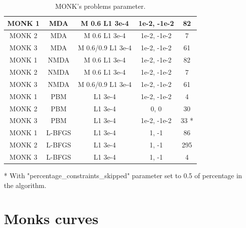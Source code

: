 \begin{table}[H]
\begin{tabular}{|c|c|c|c|c|}
		MONK 1        &    MDA & M  0.6 L1 3e-4 & 1e-2, -1e-2 & 82  \\ \hline
		MONK 2        &    MDA & M  0.6 L1 3e-4 & 1e-2, -1e-2 & 7  \\ \hline
		MONK 3        &    MDA & M  0.6/0.9 L1 3e-4 & 1e-2, -1e-2 & 61  \\ \hline
		MONK 1        &    NMDA & M  0.6 L1 3e-4 & 1e-2, -1e-2 & 82  \\ \hline
		MONK 2        &    NMDA & M  0.6 L1 3e-4 & 1e-2, -1e-2 & 7  \\ \hline
		MONK 3        &    NMDA & M  0.6/0.9 L1 3e-4 & 1e-2, -1e-2 & 61  \\ \hline
		MONK 1        &    PBM & L1 3e-4 & 1e-2, -1e-2 & 4  \\ \hline
		MONK 2        &    PBM & L1 3e-4 & 0, 0 & 30  \\ \hline
		MONK 3        &    PBM & L1 3e-4 & 1e-2, -1e-2 & 33 *  \\ \hline
		MONK 1        &    L-BFGS & L1 3e-4 & 1, -1 & 86  \\ \hline
		MONK 2        &    L-BFGS & L1 3e-4 & 1, -1 & 295  \\ \hline
		MONK 3        &    L-BFGS & L1 3e-4 & 1, -1 & 4  \\ \hline
	\end{tabular}
	\caption{MONK's problems parameter.}
	\label{tab:dati}
\end{table}
* With "percentage\_constraints\_skipped" parameter set to 0.5 of percentage in the algorithm.
\section{Monks curves}

